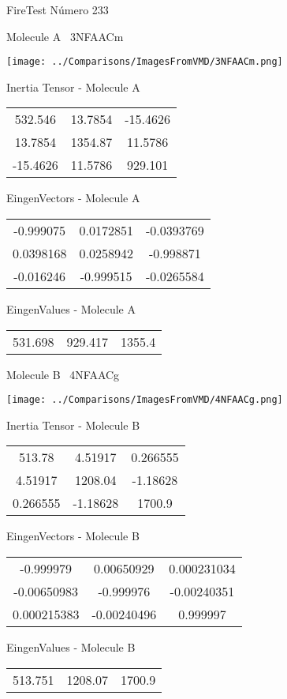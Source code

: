 \vtab[-3cm]
\begin{center}
{\large FireTest \tab Número 233}
\end{center}
\begin{multicols}{2}
\begin{center}

Molecule A \
3NFAACm

\texttt{[image: ../Comparisons/ImagesFromVMD/3NFAACm.png]}

Inertia Tensor - Molecule A \\
\begin{tabular}{|c c c|}
532.546	 & 	13.7854	 & 	-15.4626	 \\
13.7854	 & 	1354.87	 & 	11.5786	 \\
-15.4626	 & 	11.5786	 & 	929.101
\end{tabular}

\vtab
 EingenVectors - Molecule A     \\
\begin{tabular}{|c c c|}
-0.999075	 & 	0.0172851	 & 	-0.0393769	 \\
0.0398168	 & 	0.0258942	 & 	-0.998871	 \\
-0.016246	 & 	-0.999515	 & 	-0.0265584
\end{tabular}

\vtab
 EingenValues - Molecule A     \\
\begin{tabular}{|c c c|}
531.698	 & 	929.417	 & 	1355.4	 \\
\end{tabular}
\columnbreak

Molecule B \
4NFAACg

\texttt{[image: ../Comparisons/ImagesFromVMD/4NFAACg.png]}

Inertia Tensor - Molecule B \\
\begin{tabular}{|c c c|}
513.78	 & 	4.51917	 & 	0.266555	 \\
4.51917	 & 	1208.04	 & 	-1.18628	 \\
0.266555	 & 	-1.18628	 & 	1700.9
\end{tabular}

\vtab
 EingenVectors - Molecule B     \\
\begin{tabular}{|c c c|}
-0.999979	 & 	0.00650929	 & 	0.000231034	 \\
-0.00650983	 & 	-0.999976	 & 	-0.00240351	 \\
0.000215383	 & 	-0.00240496	 & 	0.999997
\end{tabular}

\vtab
 EingenValues - Molecule B     \\
\begin{tabular}{|c c c|}
513.751	 & 	1208.07	 & 	1700.9	 \\
\end{tabular}

\end{center}
\end{multicols}

